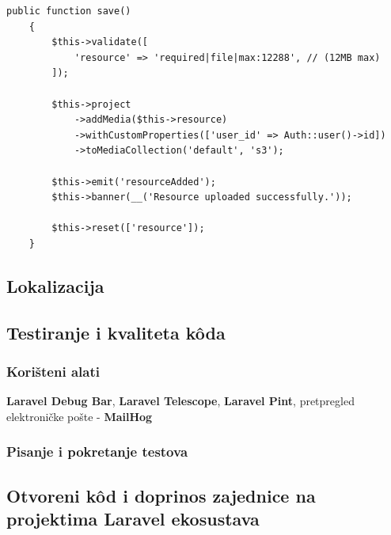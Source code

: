 \begin{lstlisting}[caption={Asociranje resursa s pripadajućim projektom i njegovo pohranjivanje koristeći Media Library metode}, label=uploadResource]
    public function save()
    {
        $this->validate([
            'resource' => 'required|file|max:12288', // (12MB max)
        ]);

        $this->project
            ->addMedia($this->resource)
            ->withCustomProperties(['user_id' => Auth::user()->id])
            ->toMediaCollection('default', 's3');

        $this->emit('resourceAdded');
        $this->banner(__('Resource uploaded successfully.'));

        $this->reset(['resource']);
    }
\end{lstlisting}

\subsection{Lokalizacija}
\label{subsection:localization}

\subsection{Testiranje i kvaliteta k\^oda}

\subsubsection{Korišteni alati}
\textbf{Laravel Debug Bar}, \textbf{Laravel Telescope}, \textbf{Laravel Pint}, pretpregled elektroničke pošte - \textbf{MailHog}

\subsubsection{Pisanje i pokretanje testova}

\subsection{Otvoreni k\^od i doprinos zajednice na projektima Laravel ekosustava}
